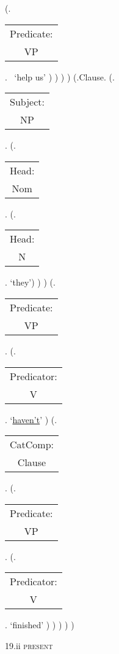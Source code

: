 \documentclass[12pt,letterpaper]{article}
\begin{document}
\begin{figure}
\begin{center}
\begin{parsetree}
			(.\begin{tabular}{c}Predicate:\\VP\end{tabular}.~ `help us' )
			)
			)
			)
			(.Clause.
			(.\begin{tabular}{c}Subject:\\NP\end{tabular}.  
			(.\begin{tabular}{c}Head:\\Nom\end{tabular}.
			(.\begin{tabular}{c}Head:\\N\end{tabular}. `they')
			)
			)
			(.\begin{tabular}{c}Predicate:\\VP\end{tabular}.
			(.\begin{tabular}{c}Predicator:\\V\end{tabular}.    `\underline{haven't}' )
			(.\begin{tabular}{c}CatComp:\\Clause\end{tabular}. 
			(.\begin{tabular}{c}Predicate:\\VP\end{tabular}.
			(.\begin{tabular}{c}Predicator:\\V\end{tabular}.    `finished' )
			)
			)
			)
			)
			
		\end{parsetree}
		\hfill \break \hfill \break
		19.ii \textsc{present}
	\end{center}
\end{figure}
\end{document}
